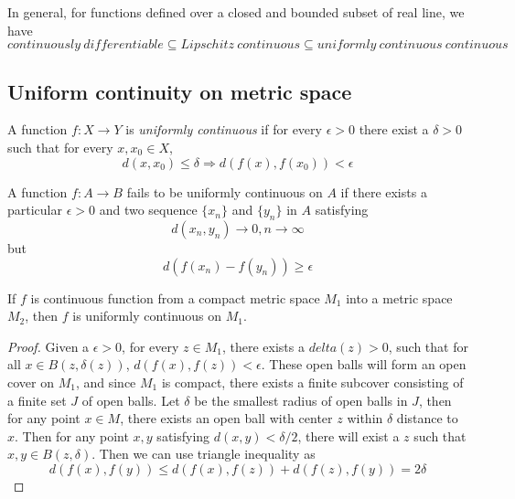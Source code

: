\begin{refsection}
\begin{remark}
In general, for functions defined over a closed and bounded subset of real line, we have
$$continuously~differentiable\subseteq Lipschitz~continuous \subseteq uniformly~continuous~continuous$$	
\end{remark}










\subsection{Uniform continuity on metric space}
\begin{definition}
A function $f:X\rightarrow Y$ is \emph{uniformly continuous} if for every $\epsilon > 0$ there exist a $\delta > 0$ such that for every $x,x_0 \in X$,
$$d(x,x_0) \leq \delta \Rightarrow d(f(x),f(x_0)) < \epsilon $$
\end{definition}

\begin{remark}
\cite[132]{abbott2001understanding}
A function $f:A\to B$ fails to be uniformly continuous on $A$ if there exists a particular $\epsilon > 0$ and two sequence $\{x_n\}$ and $\{y_n\}$ in $A$ satisfying
$$d(x_n,y_n)\to 0, n\to \infty$$
but
$$d(f(x_n)-f(y_n)) \geq \epsilon$$
\end{remark}


\begin{theorem}
\cite[154]{johnsonbaugh2010foundations}If $f$ is continuous function from a compact metric space $M_1$ into a metric space $M_2$, then $f$ is uniformly continuous on $M_1$. 
\end{theorem}
\begin{proof}
Given a $\epsilon > 0$, for every $z\in M_1$, there exists a $delta(z) > 0$, such that for all $x \in B(z,\delta(z))$, $d(f(x),f(z)) < \epsilon$. These open balls will form an open cover on $M_1$, and since $M_1$ is compact, there exists a finite subcover consisting of a finite set $J$ of open balls. Let $\delta$ be the smallest radius of open balls in $J$, then for any point $x\in M$, there exists an open ball with center $z$ within $\delta$ distance to $x$. Then for any point $x,y$ satisfying $d(x,y)<\delta/2$, there will exist a $z$ such that $x,y\in B(z,\delta)$. Then we can use triangle inequality as
$$d(f(x),f(y)) \leq d(f(x),f(z)) + d(f(z),f(y)) =2\delta$$
\end{proof}


\end{refsection}
